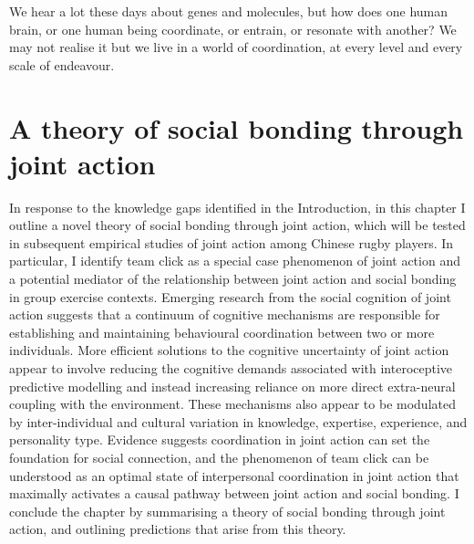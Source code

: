 
\begin{savequote}[8cm]

    We hear a lot these days about genes and molecules, but how does one human brain, or one human being coordinate, or entrain, or resonate with another?  We may not realise it but we live in a world of coordination, at every level and every scale of endeavour.

\end{savequote}




\chapter{\label{chap:theory}A theory of social bonding through joint action}


\minitoc

In response to the knowledge gaps identified in the Introduction, in this chapter I outline a novel theory of social bonding through joint action, which will be tested in subsequent empirical studies of joint action among Chinese rugby players.  In particular, I identify team click as a special case phenomenon of joint action and a potential mediator of the relationship between joint action and social bonding in group exercise contexts.  Emerging research from the social cognition of joint action suggests that a continuum of cognitive mechanisms are responsible for establishing and maintaining behavioural coordination between two or more individuals.  More efficient solutions to the cognitive uncertainty of joint action appear to involve reducing the cognitive demands associated with interoceptive predictive modelling and instead increasing reliance on more direct extra-neural coupling with the environment.  These mechanisms also appear to be modulated by inter-individual and cultural variation in knowledge, expertise, experience, and personality type.  Evidence suggests coordination in joint action can set the foundation for social connection, and the phenomenon of team click can be understood as an optimal state of interpersonal coordination in joint action that maximally activates a causal pathway between joint action and social bonding.  I conclude the chapter by summarising a theory of social bonding through joint action, and outlining predictions that arise from this theory.




